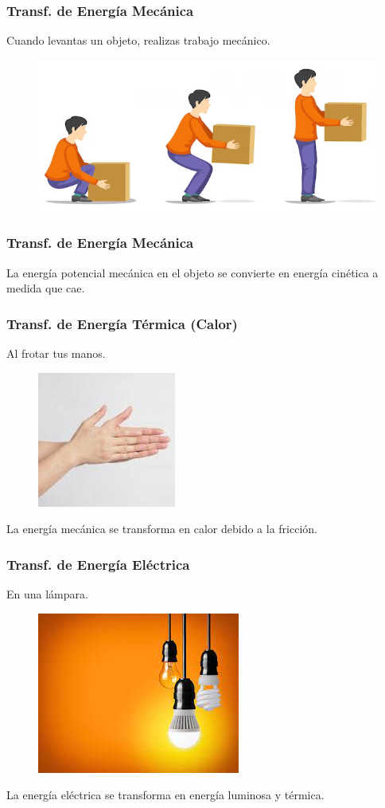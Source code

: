 \documentclass[14pt]{beamer}
\begin{document}
\begin{frame}
\frametitle{Transf. de Energía Mecánica}
Cuando levantas un objeto, realizas trabajo mecánico. 
\begin{figure}
    \centering
    \includegraphics[scale=0.25]{Imagenes/Transformacion_Energia_01.png}
\end{figure}
\end{frame}
\begin{frame}
\frametitle{Transf. de Energía Mecánica}
La energía potencial mecánica en el objeto se convierte en energía cinética a medida que cae.
\end{frame}
\begin{frame}
\frametitle{Transf. de Energía Térmica (Calor)}
\vspace*{-1cm}
Al frotar tus manos.
\pause
\begin{figure}
    \centering
    \includegraphics[scale=2.5]{Imagenes/Transformacion_Energia_02.jpg}
\end{figure}
La energía mecánica se transforma en calor debido a la fricción.
\end{frame}
\begin{frame}
\frametitle{Transf. de Energía Eléctrica}
\vspace*{-1cm}
En una lámpara.
\pause
\begin{figure}
    \centering
    \includegraphics[scale=0.5]{Imagenes/Transformacion_Energia_03.jpg}
\end{figure}
La energía eléctrica se transforma en energía luminosa y térmica.
\end{frame}
\end{document}
